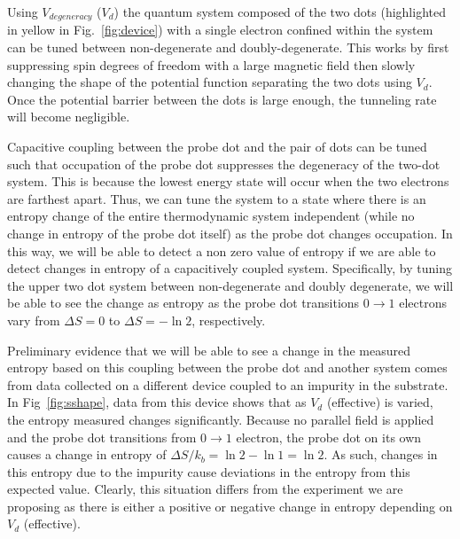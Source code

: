Using $V_{degeneracy}$ ($V_d$) the quantum system composed of the two dots (highlighted in yellow in Fig.~\ref{fig:device}) with a single electron confined within the system can be tuned between non-degenerate and doubly-degenerate. This works by first suppressing spin degrees of freedom with a large magnetic field then slowly changing the shape of the potential function separating the two dots using $V_d$. Once the potential barrier between the dots is large enough, the tunneling rate will become negligible.

Capacitive coupling between the probe dot and the pair of dots can be tuned such that occupation of the probe dot suppresses the degeneracy of the two-dot system. This is because the lowest energy state will occur when the two electrons are farthest apart. Thus, we can tune the system to a state where there is an entropy change of the entire thermodynamic system independent (while no change in entropy of the probe dot itself) as the probe dot changes occupation. In this way, we will be able to detect a non zero value of entropy if we are able to detect changes in entropy of a capacitively coupled system. Specifically, by tuning the upper two dot system between non-degenerate and doubly degenerate, we will be able to see the change as entropy as the probe dot transitions $0 \to 1$ electrons vary from $\Delta S = 0$ to $\Delta S = -\ln2$, respectively.

Preliminary evidence that we will be able to see a change in the measured entropy based on this coupling between the probe dot and another system comes from data collected on a different device coupled to an impurity in the substrate. In Fig~\ref{fig:sshape}, data from this device shows that as $V_d$ (effective) is varied, the entropy measured changes significantly. Because no parallel field is applied and the probe dot transitions from $0 \to 1$ electron, the probe dot on its own causes a change in entropy of $\Delta S/k_b = \ln 2 - \ln 1 = \ln 2 $. As such, changes in this entropy due to the impurity cause deviations in the entropy from this expected value. Clearly, this situation differs from the experiment we are proposing as there is either a positive or negative change in entropy depending on $V_d$ (effective). 


